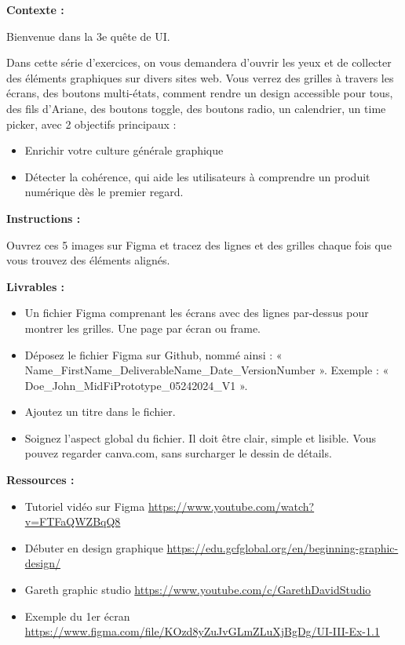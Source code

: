 \makeheaderfiles

\textbf{Contexte :}

Bienvenue dans la 3e quête de UI.

Dans cette série d'exercices, on vous demandera d'ouvrir les yeux et de collecter des éléments graphiques sur divers sites web. Vous verrez des grilles à travers les écrans, des boutons multi-états, comment rendre un design accessible pour tous, des fils d'Ariane, des boutons toggle, des boutons radio, un calendrier, un time picker, avec 2 objectifs principaux :

\begin{itemize}
\item Enrichir votre culture générale graphique
\item Détecter la cohérence, qui aide les utilisateurs à comprendre un produit numérique dès le premier regard.
\end{itemize}

\textbf{Instructions :}

Ouvrez ces 5 images sur Figma et tracez des lignes et des grilles chaque fois que vous trouvez des éléments alignés.

\textbf{Livrables :}

\begin{itemize}
\item Un fichier Figma comprenant les écrans avec des lignes par-dessus pour montrer les grilles. Une page par écran ou frame.
\item Déposez le fichier Figma sur Github, nommé ainsi : « Name\_FirstName\_DeliverableName\_Date\_VersionNumber ». Exemple : « Doe\_John\_MidFiPrototype\_05242024\_V1 ».
\item Ajoutez un titre dans le fichier.
\item Soignez l'aspect global du fichier. Il doit être clair, simple et lisible. Vous pouvez regarder canva.com, sans surcharger le dessin de détails.
\end{itemize}

\textbf{Ressources :}

\begin{itemize}
\item Tutoriel vidéo sur Figma \url{https://www.youtube.com/watch?v=FTFaQWZBqQ8}
\item Débuter en design graphique \url{https://edu.gcfglobal.org/en/beginning-graphic-design/}
\item Gareth graphic studio \url{https://www.youtube.com/c/GarethDavidStudio}
\item Exemple du 1er écran \url{https://www.figma.com/file/KOzd8yZuJvGLmZLuXjBgDg/UI-III-Ex-1.1}
\end{itemize}

